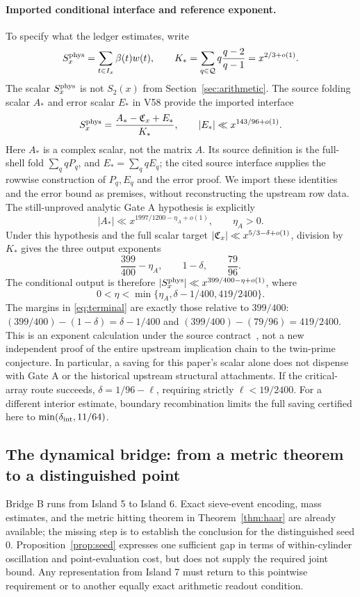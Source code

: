 \paragraph{Imported conditional interface and reference exponent.}
To specify what the ledger estimates, write
\[
S_x^{\rm phys}=\sum_{t\in I_x}\beta(t)w(t),\qquad
K_* =\sum_{q\in\mathcal Q}q\frac{q-2}{q-1}=x^{2/3+o(1)}.
\]
The scalar $S_x^{\rm phys}$ is not $S_2(x)$ from Section~\ref{sec:arithmetic}.
The source folding scalar $A_*$ and error scalar $E_*$ in V58 provide the imported interface~\cite{archivev58}
\[
S_x^{\rm phys}=\frac{A_*-\mathfrak C_x+E_*}{K_*},\qquad
|E_*|\ll x^{143/96+o(1)}.
\]
Here $A_*$ is a complex scalar, not the matrix $A$. Its source definition is the full-shell fold $\sum_q qP_q$, and $E_*=\sum_q qE_q$; the cited source interface supplies the rowwise construction of $P_q,E_q$ and the error proof.
We import these identities and the error bound as premises, without reconstructing the upstream row data.
The still-unproved analytic Gate A hypothesis is explicitly
\[
|A_*|\ll x^{1997/1200-\eta_A+o(1)},\qquad \eta_A>0.
\]
Under this hypothesis and the full scalar target $|\mathfrak C_x|\ll x^{5/3-\delta+o(1)}$, division by $K_*$ gives the three output exponents
\[
\frac{399}{400}-\eta_A,\qquad 1-\delta,\qquad \frac{79}{96}.
\]
The conditional output is therefore $|S_x^{\rm phys}|\ll x^{399/400-\eta+o(1)}$, where
\begin{equation}
0<\eta<\min\{\eta_A,\delta-1/400,419/2400\}.\label{eq:terminal}
\end{equation}
The margins in \eqref{eq:terminal} are exactly those relative to $399/400$:
$(399/400)-(1-\delta)=\delta-1/400$ and
$(399/400)-(79/96)=419/2400$.
This is an exponent calculation under the source contract~\cite{archivev58,archivev59,archivephysical}, not a new independent proof of the entire upstream implication chain to the twin-prime conjecture.
In particular, a saving for this paper's scalar alone does not dispense with Gate A or the historical upstream structural attachments.
If the critical-array route succeeds, $\delta=1/96-\ell$, requiring strictly $\ell<19/2400$.
For a different interior estimate, boundary recombination limits the full saving certified here to $\min(\delta_{\rm int},11/64)$.

\subsection{The dynamical bridge: from a metric theorem to a distinguished point}
Bridge B runs from Island 5 to Island 6. Exact sieve-event encoding, mass estimates, and the metric hitting theorem in Theorem~\ref{thm:haar} are already available; the missing step is to establish the conclusion for the distinguished seed $0$.
Proposition~\ref{prop:seed} expresses one sufficient gap in terms of within-cylinder oscillation and point-evaluation cost, but does not supply the required joint bound.
Any representation from Island 7 must return to this pointwise requirement or to another equally exact arithmetic readout condition.

